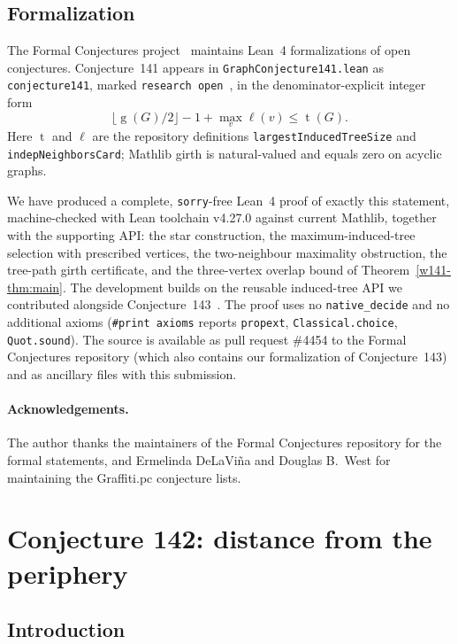 \documentclass[11pt]{article}
\numberwithin{equation}{section}
\theoremstyle{remark}
\newcommand{\tr}{\operatorname{t}}
\newcommand{\gr}{\operatorname{g}}
\newcommand{\lv}{\ell}
\begin{document}
\subsection{Formalization}\label{w141-sec:formal}

The Formal Conjectures project~\cite{FC} maintains Lean~4 formalizations of
open conjectures.  Conjecture~141 appears in \texttt{GraphConjecture141.lean}
as \texttt{conjecture141}, marked \texttt{research open}~\cite{FC141}, in
the denominator-explicit integer form
\[
  \lfloor\gr(G)/2\rfloor-1+\max_v\lv(v)\le\tr(G).
\]
Here $\tr$ and $\lv$ are the repository definitions
\texttt{largestInducedTree\allowbreak Size} and
\texttt{indepNeighbors\allowbreak Card}; Mathlib girth is natural-valued and
equals zero on acyclic graphs.

We have produced a complete, \texttt{sorry}-free Lean~4 proof of exactly this
statement, machine-checked with Lean toolchain v4.27.0 against current
Mathlib, together with the supporting API: the star construction, the
maximum-induced-tree selection with prescribed vertices, the two-neighbour
maximality obstruction, the tree-path girth certificate, and the
three-vertex overlap bound of Theorem~\ref{w141-thm:main}.  The development
builds on the reusable induced-tree API we contributed alongside
Conjecture~143~\cite{FC4454}.  The proof uses no \texttt{native\_decide} and no
additional axioms (\texttt{\#print axioms} reports \texttt{propext},
\texttt{Classical.choice}, \texttt{Quot.sound}).  The source is available as
pull request \#4454 to the Formal Conjectures repository (which also contains
our formalization of Conjecture~143) and as ancillary files with this
submission.

\paragraph{Acknowledgements.}
The author thanks the maintainers of the Formal Conjectures repository for
the formal statements, and Ermelinda DeLaVi\~na and Douglas B.\ West for
maintaining the Graffiti.pc conjecture lists.

\section{Conjecture 142: distance from the periphery}
\subsection{Introduction}
\end{document}
